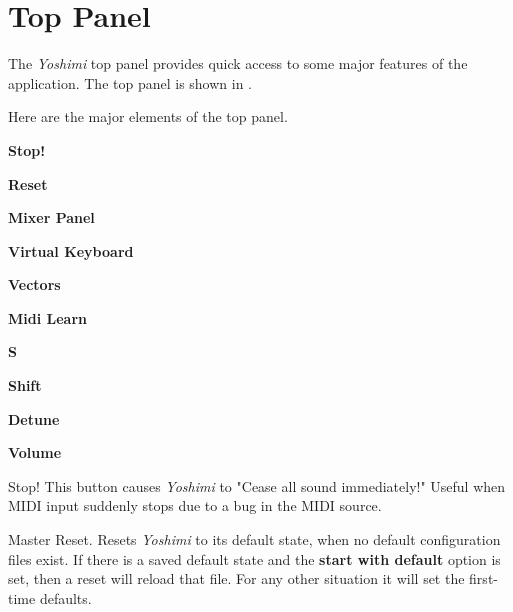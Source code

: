 %
%
%

\section{Top Panel}
\label{sec:top_panel}

   The \textsl{Yoshimi} top panel provides quick access to some major
   features of the application.
   The top panel is shown in
   .

   Here are the major elements of the top panel.

   \begin{enumber}
      \item \textbf{Stop!}
      \item \textbf{Reset}
      \item \textbf{Mixer Panel}
      \item \textbf{Virtual Keyboard}
      \item \textbf{Vectors}
      \item \textbf{Midi Learn}
      \item \textbf{S}
      \item \textbf{Shift}
      \item \textbf{Detune}
      \item \textbf{Volume}
   \end{enumber}

   \setcounter{ItemCounter}{0}      %

   Stop!
   This button causes \textsl{Yoshimi} to
   "Cease all sound immediately!"
   Useful when MIDI input suddenly stops due to a bug in the MIDI source.

   Master Reset.
   Resets \textsl{Yoshimi} to its default state, when no default configuration
   files exist.  If there is a saved default state and the \textbf{start with
   default} option is set, then a reset will reload that file. For any other
   situation it will set the first-time defaults.

